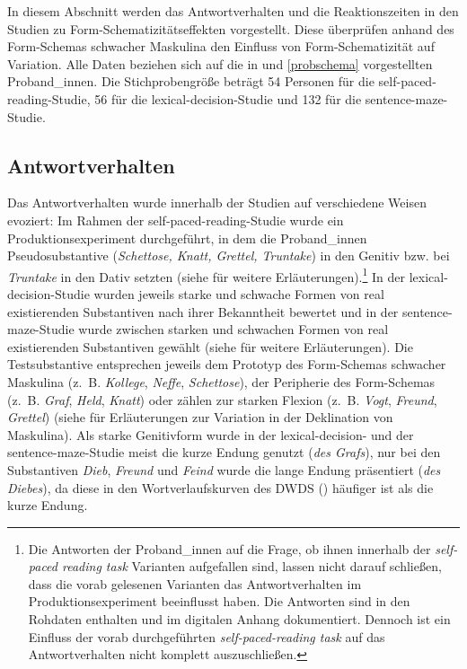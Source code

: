 In diesem Abschnitt werden das Antwortverhalten und die Reaktionszeiten in den Studien zu Form-Schematizitätseffekten vorgestellt. Diese überprüfen anhand des Form-Schemas schwacher Maskulina den Einfluss von Form-Sche\-ma\-ti\-zi\-tät auf Variation. Alle  Daten beziehen sich auf die in  und \ref{probschema} vorgestellten Proband\_innen. Die Stichprobengröße beträgt 54 Personen für die self-paced-reading-Studie, 56 für die lexical-decision-Studie und 132 für die sentence-maze-Studie. 

\subsection{Antwortverhalten}

Das Antwortverhalten wurde innerhalb der Studien auf verschiedene Weisen evoziert: Im Rahmen der self-paced-reading-Studie wurde ein Produktionsexperiment durchgeführt, in dem die Pro\-band\_\-innen Pseudosubstantive (\textit{Schettose, Knatt, Grettel, Truntake}) in den Genitiv bzw. bei \textit{Truntake} in den Dativ setzten (siehe  für weitere Erläuterungen).\footnote{Die Antworten der Proband\_innen auf die Frage, ob ihnen innerhalb der \textit{self-paced reading task} Varianten aufgefallen sind, lassen nicht darauf schließen, dass die vorab gelesenen Varianten das Antwortverhalten im Produktionsexperiment beeinflusst haben. Die Antworten sind in den Rohdaten enthalten und im digitalen Anhang dokumentiert. Dennoch ist ein Einfluss der vorab durchgeführten \textit{self-paced-reading task} auf das Antwortverhalten nicht komplett auszuschließen.} In der lexical-decision-Studie wurden jeweils starke und schwache Formen von real existierenden Substantiven nach ihrer Bekanntheit bewertet und in der sentence-maze-Studie wurde zwischen starken und schwachen Formen von real existierenden Substantiven gewählt (siehe  für weitere Erläuterungen). Die Testsubstantive entsprechen jeweils dem Prototyp des Form-Schemas schwacher Maskulina (z.~B. \textit{Kollege}, \textit{Neffe}, \textit{Schettose}), der Peripherie des Form-Schemas (z.~B. \textit{Graf}, \textit{Held}, \textit{Knatt}) oder zählen zur starken Flexion (z.~B. \textit{Vogt}, \textit{Freund}, \textit{Grettel}) (siehe  für Erläuterungen zur Variation in der Deklination von Maskulina). Als starke Genitivform wurde in der lexical-decision- und der sentence-maze-Studie meist die kurze Endung genutzt (\textit{des Grafs}), nur bei den Substantiven \textit{Dieb}, \textit{Freund} und \textit{Feind} wurde die lange Endung präsentiert (\textit{des Diebes}), da diese in den Wortverlaufskurven des DWDS (\cite{BerlinBrandenburgischeAkademiederWissenschaften.2019}) häufiger ist als die kurze Endung. 

